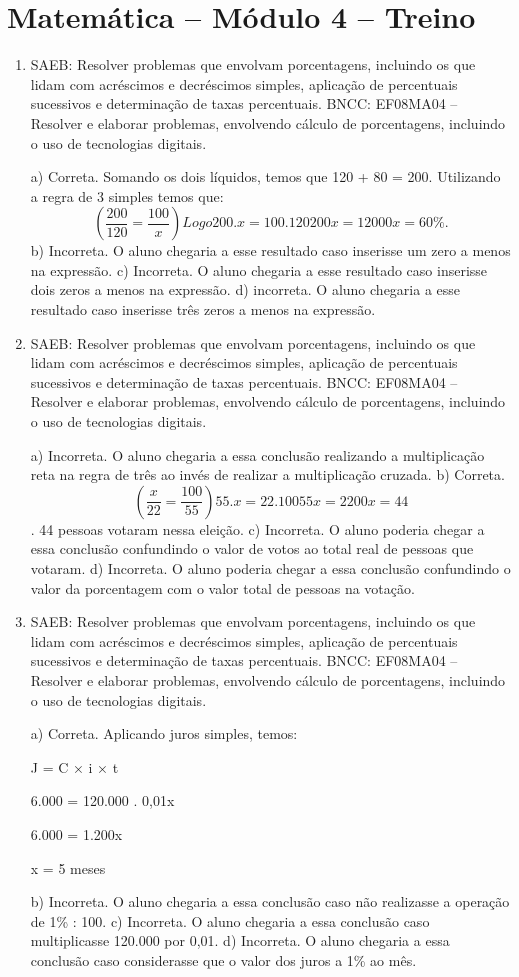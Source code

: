 \section*{Matemática – Módulo 4 – Treino}
\begin{enumerate}
\item SAEB: Resolver problemas que envolvam porcentagens, incluindo os que
lidam com acréscimos e decréscimos simples, aplicação de percentuais
sucessivos e determinação de taxas percentuais.
BNCC: EF08MA04 -- Resolver e elaborar problemas, envolvendo cálculo de
porcentagens, incluindo o uso de tecnologias digitais.

a) Correta. Somando os dois líquidos, temos que 120 + 80 = 200.
Utilizando a regra de 3 simples temos que:
$$(\frac{200}{120} = \frac{100}{x})
Logo 200 . x = 100 . 120
200 x = 12 000
x = 60\%.$$
b) Incorreta. O aluno chegaria a esse resultado caso inserisse um
zero a menos na expressão.
c) Incorreta. O aluno chegaria a esse resultado caso inserisse dois
zeros a menos na expressão.
d) incorreta. O aluno chegaria a esse resultado caso inserisse três
zeros a menos na expressão.

\item SAEB: Resolver problemas que envolvam porcentagens, incluindo os que
lidam com acréscimos e decréscimos simples, aplicação de percentuais
sucessivos e determinação de taxas percentuais.
BNCC: EF08MA04 -- Resolver e elaborar problemas, envolvendo cálculo de
porcentagens, incluindo o uso de tecnologias digitais.

a) Incorreta. O aluno chegaria a essa conclusão realizando a
multiplicação reta na regra de três ao invés de realizar a multiplicação
cruzada.
b) Correta. $$(\frac{x}{22} = \frac{100}{55})
55 . x = 22 . 100
55x = 2200
x = 44$$. 44 pessoas votaram nessa eleição.
c) Incorreta. O aluno poderia chegar a essa conclusão confundindo o
valor de votos ao total real de pessoas que votaram.
d) Incorreta. O aluno poderia chegar a essa conclusão confundindo o
valor da porcentagem com o valor total de pessoas na votação.

\item SAEB: Resolver problemas que envolvam porcentagens, incluindo os que
lidam com acréscimos e decréscimos simples, aplicação de percentuais
sucessivos e determinação de taxas percentuais.
BNCC: EF08MA04 -- Resolver e elaborar problemas, envolvendo cálculo de
porcentagens, incluindo o uso de tecnologias digitais.

a) Correta. Aplicando juros simples, temos:

J = C × i × t

6.000 = 120.000 . 0,01x

6.000 = 1.200x

x = 5 meses

b) Incorreta. O aluno chegaria a essa conclusão caso não realizasse
a operação de 1\% : 100.
c) Incorreta. O aluno chegaria a essa conclusão caso multiplicasse
120.000 por 0,01.
d) Incorreta. O aluno chegaria a essa conclusão caso considerasse
que o valor dos juros a 1\% ao mês.
\end{enumerate}



